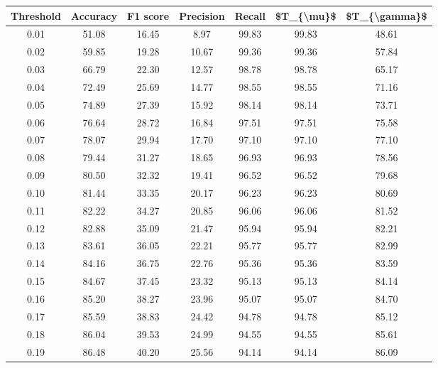 \begin{tabular}{|c|c|c|c|c|c|c|}
\toprule
 Threshold &  Accuracy &  F1 score &  Precision &  Recall &  \$T\_\{\textbackslash mu\}\$ &  \$T\_\{\textbackslash gamma\}\$ \\
\hline
      0.01 &     51.08 &     16.45 &       8.97 &   99.83 &      99.83 &         48.61 \\
      0.02 &     59.85 &     19.28 &      10.67 &   99.36 &      99.36 &         57.84 \\
      0.03 &     66.79 &     22.30 &      12.57 &   98.78 &      98.78 &         65.17 \\
      0.04 &     72.49 &     25.69 &      14.77 &   98.55 &      98.55 &         71.16 \\
      0.05 &     74.89 &     27.39 &      15.92 &   98.14 &      98.14 &         73.71 \\
      0.06 &     76.64 &     28.72 &      16.84 &   97.51 &      97.51 &         75.58 \\
      0.07 &     78.07 &     29.94 &      17.70 &   97.10 &      97.10 &         77.10 \\
      0.08 &     79.44 &     31.27 &      18.65 &   96.93 &      96.93 &         78.56 \\
      0.09 &     80.50 &     32.32 &      19.41 &   96.52 &      96.52 &         79.68 \\
      0.10 &     81.44 &     33.35 &      20.17 &   96.23 &      96.23 &         80.69 \\
      0.11 &     82.22 &     34.27 &      20.85 &   96.06 &      96.06 &         81.52 \\
      0.12 &     82.88 &     35.09 &      21.47 &   95.94 &      95.94 &         82.21 \\
      0.13 &     83.61 &     36.05 &      22.21 &   95.77 &      95.77 &         82.99 \\
      0.14 &     84.16 &     36.75 &      22.76 &   95.36 &      95.36 &         83.59 \\
      0.15 &     84.67 &     37.45 &      23.32 &   95.13 &      95.13 &         84.14 \\
      0.16 &     85.20 &     38.27 &      23.96 &   95.07 &      95.07 &         84.70 \\
      0.17 &     85.59 &     38.83 &      24.42 &   94.78 &      94.78 &         85.12 \\
      0.18 &     86.04 &     39.53 &      24.99 &   94.55 &      94.55 &         85.61 \\
      0.19 &     86.48 &     40.20 &      25.56 &   94.14 &      94.14 &         86.09 \\

\end{tabular}
